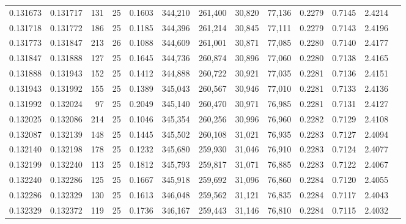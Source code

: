 \begin{tabular}{rrrrrrrrrrrrr}
0.131673 & 0.131717 &   131 &  25 &                                     0.1603 & 344,210 & 261,400 &  30,820 &  77,136 & 0.2279 & 0.7145 & 2.4214 \\
0.131718 & 0.131772 &   186 &  25 &                                     0.1185 & 344,396 & 261,214 &  30,845 &  77,111 & 0.2279 & 0.7143 & 2.4196 \\
0.131773 & 0.131847 &   213 &  26 &                                     0.1088 & 344,609 & 261,001 &  30,871 &  77,085 & 0.2280 & 0.7140 & 2.4177 \\
0.131847 & 0.131888 &   127 &  25 &                                     0.1645 & 344,736 & 260,874 &  30,896 &  77,060 & 0.2280 & 0.7138 & 2.4165 \\
0.131888 & 0.131943 &   152 &  25 &                                     0.1412 & 344,888 & 260,722 &  30,921 &  77,035 & 0.2281 & 0.7136 & 2.4151 \\
0.131943 & 0.131992 &   155 &  25 &                                     0.1389 & 345,043 & 260,567 &  30,946 &  77,010 & 0.2281 & 0.7133 & 2.4136 \\
0.131992 & 0.132024 &    97 &  25 &                                     0.2049 & 345,140 & 260,470 &  30,971 &  76,985 & 0.2281 & 0.7131 & 2.4127 \\
0.132025 & 0.132086 &   214 &  25 &                                     0.1046 & 345,354 & 260,256 &  30,996 &  76,960 & 0.2282 & 0.7129 & 2.4108 \\
0.132087 & 0.132139 &   148 &  25 &                                     0.1445 & 345,502 & 260,108 &  31,021 &  76,935 & 0.2283 & 0.7127 & 2.4094 \\
0.132140 & 0.132198 &   178 &  25 &                                     0.1232 & 345,680 & 259,930 &  31,046 &  76,910 & 0.2283 & 0.7124 & 2.4077 \\
0.132199 & 0.132240 &   113 &  25 &                                     0.1812 & 345,793 & 259,817 &  31,071 &  76,885 & 0.2283 & 0.7122 & 2.4067 \\
0.132240 & 0.132286 &   125 &  25 &                                     0.1667 & 345,918 & 259,692 &  31,096 &  76,860 & 0.2284 & 0.7120 & 2.4055 \\
0.132286 & 0.132329 &   130 &  25 &                                     0.1613 & 346,048 & 259,562 &  31,121 &  76,835 & 0.2284 & 0.7117 & 2.4043 \\
0.132329 & 0.132372 &   119 &  25 &                                     0.1736 & 346,167 & 259,443 &  31,146 &  76,810 & 0.2284 & 0.7115 & 2.4032 \\

\end{tabular}
